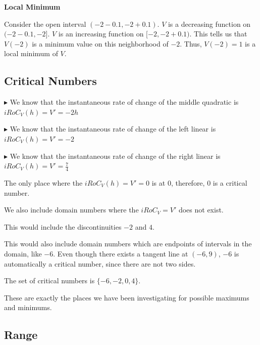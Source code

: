 \documentclass{ximera}
\begin{document}
\begin{explanation} \textbf{\textcolor{red!75!green}{Local Minimum}}  


Consider the open interval $(-2 - 0.1, -2 + 0.1)$. $V$ is a decreasing function on $(-2 - 0.1, -2]$. $V$ is an increasing function on $[-2, -2 + 0.1)$.  This tells us that $V(-2)$ is a minimum value on this neighborhood of $-2$.  Thus, $V(-2) = 1$ is a local minimum of $V$.





\end{explanation}









\subsection*{Critical Numbers} 


$\blacktriangleright$ We know that the instantaneous rate of change of the middle quadratic is $iRoC_V(h) = V' = -2h$ 

$\blacktriangleright$ We know that the instantaneous rate of change of the left linear is $iRoC_V(h) = V' = -2$

$\blacktriangleright$ We know that the instantaneous rate of change of the right linear is $iRoC_V(h) = V' = \frac{7}{4}$



The only place where the $iRoC_V(h) = V' = 0$ is at $0$, therefore, $0$ is a critical number.


We also include domain numbers where the $iRoC_V = V'$ does not exist.  

This would include the discontinuities $-2$ and $4$. 


This would also include domain numbers which are endpoints of intervals in the domain, like $-6$. Even though there exists a tangent line at $(-6, 9)$, $-6$ is automatically a critical number, since there are not two sides.



The set of critical numbers is $\{ -6, -2, 0, 4 \}$.




These are exactly the places we have been investigating for possible maximums and minimums.






\subsection*{Range} 
\end{document}
